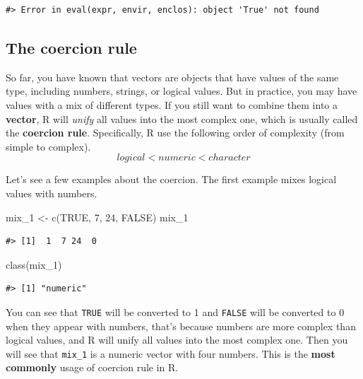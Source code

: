 \documentclass[
]{book}
\newenvironment{Shaded}{\begin{snugshade}}{\end{snugshade}}
\newcommand{\ConstantTok}[1]{\textcolor[rgb]{0.00,0.00,0.00}{#1}}
\newcommand{\DecValTok}[1]{\textcolor[rgb]{0.00,0.00,0.81}{#1}}
\newcommand{\FunctionTok}[1]{\textcolor[rgb]{0.00,0.00,0.00}{#1}}
\newcommand{\NormalTok}[1]{#1}
\newcommand{\OtherTok}[1]{\textcolor[rgb]{0.56,0.35,0.01}{#1}}
\begin{document}
\begin{verbatim}
#> Error in eval(expr, envir, enclos): object 'True' not found
\end{verbatim}

\hypertarget{the-coercion-rule}{%
\subsection{The coercion rule}\label{the-coercion-rule}}

So far, you have known that vectors are objects that have values of the same type, including numbers, strings, or logical values. But in practice, you may have values with a mix of different types. If you still want to combine them into a \textbf{vector}, R will \emph{unify} all values into the most complex one, which is usually called the \textbf{coercion rule}. Specifically, R use the following order of complexity (from simple to complex).
\[logical < numeric < character\]

Let's see a few examples about the coercion. The first example mixes logical values with numbers.

\begin{Shaded}
\begin{Highlighting}[]
\NormalTok{mix\_1 }\OtherTok{\textless{}{-}} \FunctionTok{c}\NormalTok{(}\ConstantTok{TRUE}\NormalTok{, }\DecValTok{7}\NormalTok{, }\DecValTok{24}\NormalTok{, }\ConstantTok{FALSE}\NormalTok{)}
\NormalTok{mix\_1 }
\end{Highlighting}
\end{Shaded}

\begin{verbatim}
#> [1]  1  7 24  0
\end{verbatim}

\begin{Shaded}
\begin{Highlighting}[]
\FunctionTok{class}\NormalTok{(mix\_1)}
\end{Highlighting}
\end{Shaded}

\begin{verbatim}
#> [1] "numeric"
\end{verbatim}

You can see that \texttt{TRUE} will be converted to 1 and \texttt{FALSE} will be converted to 0 when they appear with numbers, that's because numbers are more complex than logical values, and R will unify all values into the most complex one. Then you will see that \texttt{mix\_1} is a numeric vector with four numbers. This is the \textbf{most commonly} usage of coercion rule in R.
\end{document}
